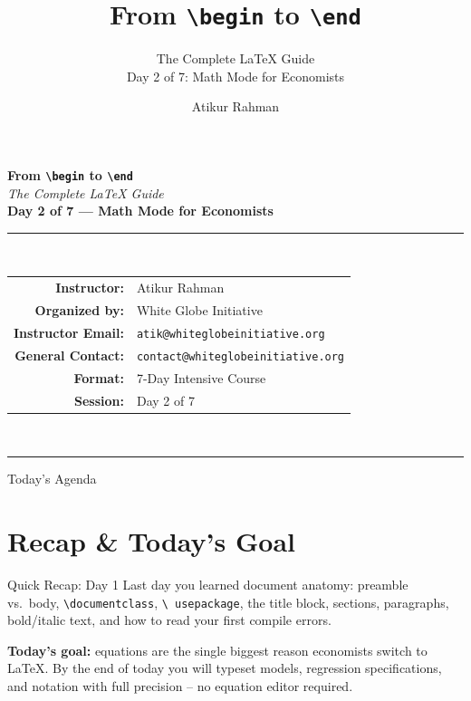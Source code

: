 \documentclass[11pt,aspectratio=169]{beamer}
\title[\texttt{\textbackslash begin} to \texttt{\textbackslash end}]{From \texttt{\textbackslash begin} to \texttt{\textbackslash end}}
\subtitle{The Complete LaTeX Guide \\[2pt] \normalsize Day 2 of 7: Math Mode for Economists}
\author[A.\ Rahman]{Atikur Rahman}
\institute[White Globe Initiative]{White Globe Initiative}
\begin{document}
\begin{frame}[plain]
  \begin{center}
    \vspace{4pt}
    {\Huge\bfseries{}From \texttt{\textbackslash begin} to \texttt{\textbackslash end}}\\[6pt]
    {\Large\itshape The Complete LaTeX Guide}\\[18pt]
    {\large\bfseries Day 2 of 7 --- Math Mode for Economists}\\[22pt]
    \rule{0.7\textwidth}{0.4pt}\\[14pt]
    \begin{tabular}{rl}
      \textbf{Instructor:}       & Atikur Rahman \\[3pt]
      \textbf{Organized by:}     & White Globe Initiative \\[3pt]
      \textbf{Instructor Email:} & \texttt{atik@whiteglobeinitiative.org} \\[3pt]
      \textbf{General Contact:}  & \texttt{contact@whiteglobeinitiative.org} \\[3pt]
      \textbf{Format:}           & 7-Day Intensive Course \\[3pt]
      \textbf{Session:}          & Day 2 of 7 \\
    \end{tabular}\\[18pt]
    \rule{0.7\textwidth}{0.4pt}
  \end{center}
\end{frame}

\begin{frame}{Today's Agenda}
  \tableofcontents
\end{frame}

\section{Recap \& Today's Goal}

\begin{frame}{Quick Recap: Day 1}
  \small
  Last day you learned document anatomy: preamble vs.\ body,
  \texttt{\textbackslash documentclass}, \texttt{\textbackslash
  usepackage}, the title block, sections, paragraphs, bold/italic text,
  and how to read your first compile errors.
  \vspace{6pt}

  \textbf{Today's goal:} equations are the single biggest reason
  economists switch to LaTeX. By the end of today you will typeset
  models, regression specifications, and notation with full precision
  -- no equation editor required.
\end{frame}
\end{document}
